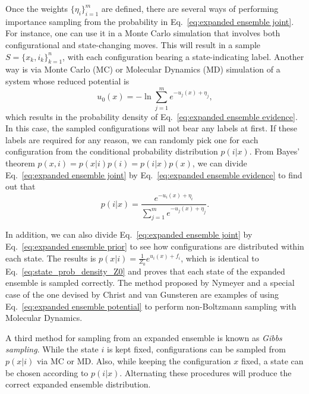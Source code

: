 \documentclass[aip,jcp,reprint,amsmath,amssymb]{revtex4-1}
\begin{document}
Once the weights $\{\eta_i\}_{i=1}^m$ are defined, there are several ways of performing importance sampling from the probability in Eq.~\eqref{eq:expanded ensemble joint}. For instance, one can use it in a Monte Carlo simulation that involves both configurational and state-changing moves.\cite{Lyubartsev_1992} This will result in a sample $S = \{x_k,i_k\}_{k=1}^n$, with each configuration bearing a state-indicating label. Another way is via Monte Carlo (MC) or Molecular Dynamics (MD) simulation of a system whose reduced potential is
\begin{equation}
\label{eq:expanded ensemble potential}
u_0(x) = - \ln \sum_{j=1}^m e^{-u_j(x) + \eta_j},
\end{equation}
which results in the probability density of Eq.~\eqref{eq:expanded ensemble evidence}. In this case, the sampled configurations will not bear any labels at first. If these labels are required for any reason, we can randomly pick one for each configuration from the conditional probability distribution $p(i|x)$.\cite{Nymeyer_2010} From Bayes' theorem $p(x,i) = p(x|i) p(i) = p(i|x) p(x)$, we can divide Eq.~\eqref{eq:expanded ensemble joint} by Eq.~\eqref{eq:expanded ensemble evidence} to find out that
\begin{equation}
\label{eq:expanded ensemble posterior}
p(i|x) = \frac{e^{-u_i(x) + \eta_i}}{\sum_{j=1}^m e^{-u_j(x) + \eta_j}}.
\end{equation}

In addition, we can also divide Eq.~\eqref{eq:expanded ensemble joint} by Eq.~\eqref{eq:expanded ensemble prior} to see how configurations are distributed within each state. The results is $p(x|i) = \frac{1}{Z_0} e^{u_i(x) + f_i}$, which is identical to Eq.~\eqref{eq:state_prob_density_Z0} and proves that each state of the expanded ensemble is sampled correctly. The method proposed by Nymeyer\cite{Nymeyer_2010} and a special case of the one devised by Christ and van Gunsteren\cite{Christ_2007, *Christ_2008, *Christ_2009} are examples of using Eq.~\eqref{eq:expanded ensemble potential} to perform non-Boltzmann sampling with Molecular Dynamics.

A third method for sampling from an expanded ensemble is known as \textit{Gibbs sampling}.\cite{Chodera_2011} While the state $i$ is kept fixed, configurations can be sampled from $p(x|i)$ via MC or MD. Also, while keeping the configuration $x$ fixed, a state can be chosen according to $p(i|x)$. Alternating these procedures will produce the correct expanded ensemble distribution.\cite{Chodera_2011}
\end{document}
